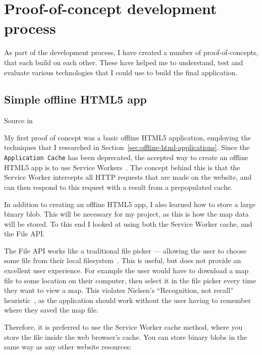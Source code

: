 \documentclass[hyphens]{final_report}
\begin{document}
\clearpage
\chapter{Proof-of-concept development process}

As part of the development process, I have created a number of proof-of-concepts, that each build on each other. These have helped me to understand, test and evaluate various technologies that I could use to build the final application.

\section{Simple offline HTML5 app}

{ \footnotesize Source in }

My first proof of concept was a basic offline HTML5 application, employing the techniques that I researched in Section~\ref{sec:offline-html-applications}. Since the \texttt{Application Cache} has been deprecated, the accepted way to create an offline HTML5 app is to use Service Workers~\cite{w3c-service-workers-caches}. The concept behind this is that the Service Worker intercepts all HTTP requests that are made on the website, and can then respond to this request with a result from a prepopulated cache.

In addition to creating an offline HTML5 app, I also learned how to store a large binary blob. This will be necessary for my project, as this is how the map data will be stored. To this end I looked at using both the Service Worker cache, and the File API\@.

The File API works like a traditional file picker --- allowing the user to choose some file from their local filesystem~\cite{w3c-file-api}. This is useful, but does not provide an excellent user experience. For example the user would have to download a map file to some location on their computer, then select it in the file picker every time they want to view a map. This violates Nielsen's ``Recognition, not recall'' heuristic~\cite{nielsen-heuristics}, as the application should work without the user having to remember where they saved the map file.

Therefore, it is preferred to use the Service Worker cache method, where you store the file inside the web browser's cache. You can store binary blobs in the same way as any other website resources:
\end{document}
